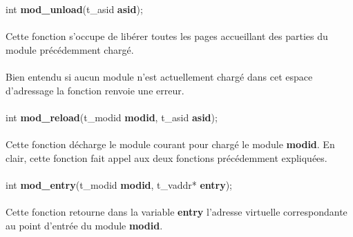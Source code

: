 \documentclass[10pt,a4wide]{article}
\begin{document}
\hspace{1.5cm}int \textbf{mod\_unload}(t\_asid \textbf{asid});

\paragraph{}

Cette fonction s'occupe de lib\'erer toutes les pages accueillant
des parties du module pr\'ec\'edemment charg\'e.

\paragraph{}

Bien entendu si aucun module n'est actuellement charg\'e dans cet
espace d'adressage la fonction renvoie une erreur.

\paragraph{}

\hspace{1.5cm}int \textbf{mod\_reload}(t\_modid \textbf{modid},
                                       t\_asid \textbf{asid});

\paragraph{}

Cette fonction d\'echarge le module courant pour charg\'e le module
\textbf{modid}. En clair, cette fonction fait appel aux deux fonctions
pr\'ec\'edemment expliqu\'ees.

\paragraph{}

\hspace{1.5cm}int \textbf{mod\_entry}(t\_modid \textbf{modid},
                                      t\_vaddr* \textbf{entry});

\paragraph{}

Cette fonction retourne dans la variable \textbf{entry} l'adresse virtuelle
correspondante au point d'entr\'ee du module \textbf{modid}.

\paragraph{}
\end{document}
